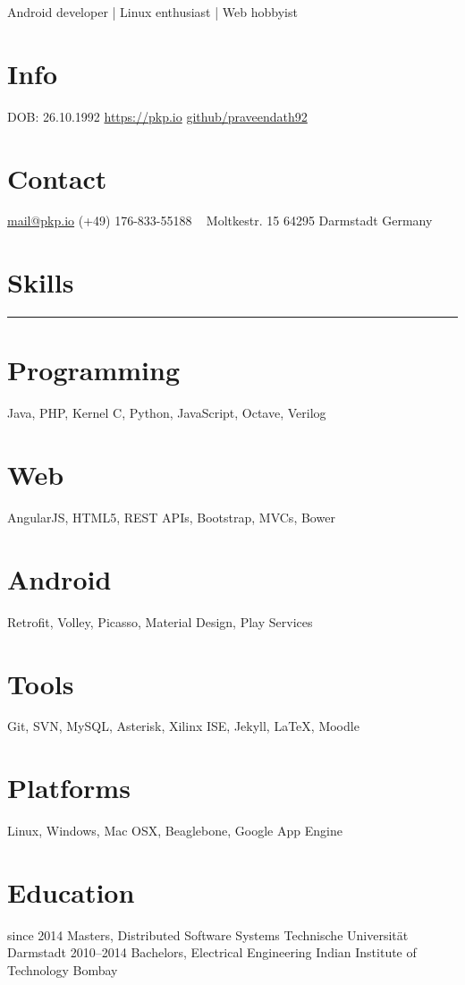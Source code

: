 \documentclass[]{friggeri-cv}
\begin{document}
       {Android developer | Linux enthusiast | Web hobbyist}

\begin{aside}
  \section{Info}
    DOB: 26.10.1992
    \href{https://pkp.io}{https://pkp.io}
    \href{https://github.com/praveendath92}{github/praveendath92}
  \section{Contact}
    \href{mailto:mail@pkp.io}{mail@pkp.io}
    (+49) 176-833-55188
    ~
    Moltkestr. 15
    64295 Darmstadt
    Germany
    ~
  \section{Skills}
    \noindent\rule{3cm}{0.5pt}
  \section{Programming}
    Java, PHP, Kernel C, Python, JavaScript, Octave, Verilog
  \section{Web}
    AngularJS, HTML5, REST APIs, Bootstrap, MVCs, Bower
  \section{Android}
    Retrofit, Volley, Picasso, Material Design, Play Services
  \section{Tools}
    Git, SVN, MySQL, Asterisk, Xilinx ISE, Jekyll, \LaTeX, Moodle
  \section{Platforms}
    Linux, Windows, Mac OSX, Beaglebone, Google App Engine
\end{aside}


\section{Education}

\begin{entrylist}
  \entry
    {since 2014}
    {Masters, {\normalfont Distributed Software Systems}}
    {Technische Universität Darmstadt}
    {}%
  \entry
    {2010–2014}
    {Bachelors, {\normalfont Electrical Engineering}}
    {Indian Institute of Technology Bombay}
    {}%
\end{entrylist}
\end{document}
